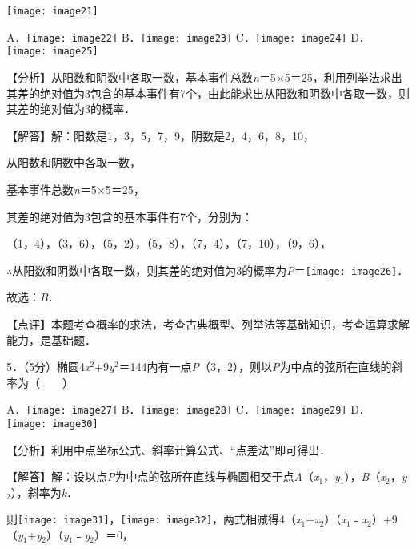 \documentclass[a4paper,11pt,UTF8,twoside]{ctexart} %
\begin{document}
\texttt{[image: image21]}

A．\texttt{[image: image22]} B．\texttt{[image: image23]} C．\texttt{[image: image24]} D．\texttt{[image: image25]}

【分析】从阳数和阴数中各取一数，基本事件总数\textit{n}＝5$\mathrm{\times}$5＝25，利用列举法求出其差的绝对值为3包含的基本事件有7个，由此能求出从阳数和阴数中各取一数，则其差的绝对值为3的概率．

【解答】解：阳数是1，3，5，7，9，阴数是2，4，6，8，10，

从阳数和阴数中各取一数，

基本事件总数\textit{n}＝5$\mathrm{\times}$5＝25，

其差的绝对值为3包含的基本事件有7个，分别为：

（1，4），（3，6），（5，2），（5，8），（7，4），（7，10），（9，6），

$\mathrm{\therefore}$从阳数和阴数中各取一数，则其差的绝对值为3的概率为\textit{P}＝\texttt{[image: image26]}．

故选：\textit{B}．

【点评】本题考查概率的求法，考查古典概型、列举法等基础知识，考查运算求解能力，是基础题．

5．（5分）椭圆4\textit{x}${}^{2}$+9\textit{y}${}^{2}$＝144内有一点\textit{P}（3，2），则以\textit{P}为中点的弦所在直线的斜率为（　　）

A．\texttt{[image: image27]} B．\texttt{[image: image28]} C．\texttt{[image: image29]} D．\texttt{[image: image30]}

【分析】利用中点坐标公式、斜率计算公式、``点差法''即可得出．

【解答】解：设以点\textit{P}为中点的弦所在直线与椭圆相交于点\textit{A}（\textit{x}${}_{1}$，\textit{y}${}_{1}$），\textit{B}（\textit{x}${}_{2}$，\textit{y}${}_{2}$），斜率为\textit{k}．

则\texttt{[image: image31]}，\texttt{[image: image32]}，两式相减得4（\textit{x}${}_{1}$+\textit{x}${}_{2}$）（\textit{x}${}_{1}$﹣\textit{x}${}_{2}$）+9（\textit{y}${}_{1}$+\textit{y}${}_{2}$）（\textit{y}${}_{1}$﹣\textit{y}${}_{2}$）＝0，
\end{document}
